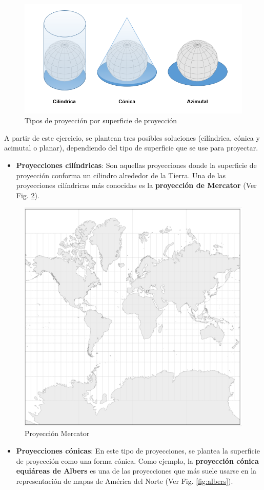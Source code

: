 \documentclass[
]{report}
\providecommand{\tightlist}{%
  \setlength{\itemsep}{0pt}\setlength{\parskip}{0pt}}
\theoremstyle{definition}
\theoremstyle{definition}
\theoremstyle{definition}
\theoremstyle{definition}
\theoremstyle{remark}
\begin{document}
\begin{figure}

{\centering \includegraphics[width=0.6\linewidth]{img/tipos_proy} 

}

\caption{Tipos de proyección por superficie de proyección}\label{fig:fi-proys}
\end{figure}

A partir de este ejercicio, se plantean tres posibles soluciones (cilíndrica,
cónica y acimutal o planar), dependiendo del tipo de superficie que se use para
proyectar.

\begin{itemize}
\tightlist
\item
  \textbf{Proyecciones cilíndricas}: Son aquellas proyecciones donde la superficie
  de proyección conforma un cilindro alrededor de la Tierra. Una de las
  proyecciones cilíndricas más conocidas es la \textbf{proyección de Mercator} (Ver
  Fig. \ref{fig:mercator}).
\end{itemize}

\begin{figure}

{\centering \includegraphics[width=0.4\linewidth]{img/mercator} 

}

\caption{Proyección Mercator}\label{fig:mercator}
\end{figure}

\begin{itemize}
\tightlist
\item
  \textbf{Proyecciones cónicas}: En este tipo de proyecciones, se plantea la
  superficie de proyección como una forma cónica. Como ejemplo, la
  \textbf{proyección cónica equiáreas de Albers} es una de las proyecciones que más
  suele usarse en la representación de mapas de América del Norte (Ver Fig.
  \ref{fig:albers}).
\end{itemize}
\end{document}

